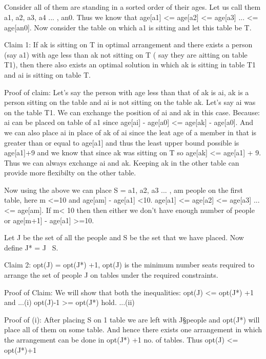 \documentclass{article}
\begin{document}
\subsection{}

Consider all of them are standing in a sorted order of their ages. Let us call them a1, a2, a3, a4 ... , an0.  Thus we know that age[a1] <= age[a2] <= age[a3] ... <= age[an0]. Now consider the table on which a1 is sitting and let this table be T.

Claim 1: If ak is sitting on T in optimal arrangement and there exists a person (say a1) with age less than ak not sitting on T ( say they are aitting on table T1), then there also exists an optimal solution in which ak is sitting in table T1 and ai is sitting on table T.

Proof of claim: Let's say the person with age less than that of ak is ai, ak is a person sitting on the table and ai is not sitting on the table ak. Let's say ai was on the table T1. We can exchange the position of ai and ak in this case. Because: ai can be placed on table of a1 since age[ai] - age[a0] <= age[ak] - age[a0]. And we can also place ai in place of ak of ai since the leat age of a member in that is greater than or equal to age[a1] and thus the least upper bound possible is age[a1]+9 and we know that since ak was sitting on T so age[ak] <= age[a1] + 9. Thus we can always exchange ai and ak. Keeping ak in the other table can provide more flexibilty on the other table.

Now using the above we can place S  = {a1, a2, a3 ... , am} people on the first table, here m <=10 and age[am] - age[a1] <10. age[a1] <= age[a2] <= age[a3] ... <= age[am]. If m< 10 then then either we don't have enough number of people or age[m+1] - age[a1] >=10. 

Let J be the set of all the people and S be the set that we have placed. Now define J* = J \ S.

Claim 2: opt(J) = opt(J*) +1, opt(J) is the minimum number seats required to arrange the set of people J on tables under the required constraints.

Proof of Claim:
We will show that both the inequalities: 
opt(J) <= opt(J*) +1 and        ...(i)
opt(J)-1 >= opt(J*) hold.       ...(ii)

Proof of (i):
After placing S on 1 table we are left with J\S people and opt(J*) will place all of them on some table. And hence there exists one arrangement in which the arrangement can be done in opt(J*) +1 no. of tables. Thus opt(J) <= opt(J*)+1
\end{document}
